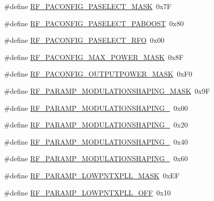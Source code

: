 \begin{DoxyCompactItemize}
\item 
\#define \hyperlink{sx1276Regs-Fsk_8h_a1f6faf51858096a4381e494bc157dedd}{R\+F\+\_\+\+P\+A\+C\+O\+N\+F\+I\+G\+\_\+\+P\+A\+S\+E\+L\+E\+C\+T\+\_\+\+M\+A\+SK}~0x7F
\item 
\#define \hyperlink{sx1276Regs-Fsk_8h_ae9a12e879be43e88ad7cff8f48010a9e}{R\+F\+\_\+\+P\+A\+C\+O\+N\+F\+I\+G\+\_\+\+P\+A\+S\+E\+L\+E\+C\+T\+\_\+\+P\+A\+B\+O\+O\+ST}~0x80
\item 
\#define \hyperlink{sx1276Regs-Fsk_8h_a01b86de3552e662d9994a1c4c4d8c571}{R\+F\+\_\+\+P\+A\+C\+O\+N\+F\+I\+G\+\_\+\+P\+A\+S\+E\+L\+E\+C\+T\+\_\+\+R\+FO}~0x00
\item 
\#define \hyperlink{sx1276Regs-Fsk_8h_aa89d945546b59e43c22a245423d58378}{R\+F\+\_\+\+P\+A\+C\+O\+N\+F\+I\+G\+\_\+\+M\+A\+X\+\_\+\+P\+O\+W\+E\+R\+\_\+\+M\+A\+SK}~0x8F
\item 
\#define \hyperlink{sx1276Regs-Fsk_8h_a88306565c0c75c9421326683fdcb84e8}{R\+F\+\_\+\+P\+A\+C\+O\+N\+F\+I\+G\+\_\+\+O\+U\+T\+P\+U\+T\+P\+O\+W\+E\+R\+\_\+\+M\+A\+SK}~0x\+F0
\item 
\#define \hyperlink{sx1276Regs-Fsk_8h_a2019a19e41c1a718452eb913fd9937d2}{R\+F\+\_\+\+P\+A\+R\+A\+M\+P\+\_\+\+M\+O\+D\+U\+L\+A\+T\+I\+O\+N\+S\+H\+A\+P\+I\+N\+G\+\_\+\+M\+A\+SK}~0x9F
\item 
\#define \hyperlink{sx1276Regs-Fsk_8h_a47d1468a141e8c1be9607da3cfc76603}{R\+F\+\_\+\+P\+A\+R\+A\+M\+P\+\_\+\+M\+O\+D\+U\+L\+A\+T\+I\+O\+N\+S\+H\+A\+P\+I\+N\+G\+\_}~0x00
\item 
\#define \hyperlink{sx1276Regs-Fsk_8h_af73d04396de25ed02028034df8c62a7e}{R\+F\+\_\+\+P\+A\+R\+A\+M\+P\+\_\+\+M\+O\+D\+U\+L\+A\+T\+I\+O\+N\+S\+H\+A\+P\+I\+N\+G\+\_}~0x20
\item 
\#define \hyperlink{sx1276Regs-Fsk_8h_aa4ea0dc5db5619e8e06345948cba2e67}{R\+F\+\_\+\+P\+A\+R\+A\+M\+P\+\_\+\+M\+O\+D\+U\+L\+A\+T\+I\+O\+N\+S\+H\+A\+P\+I\+N\+G\+\_}~0x40
\item 
\#define \hyperlink{sx1276Regs-Fsk_8h_a5b381c8b6905eb4a4ce79fef82b5d6df}{R\+F\+\_\+\+P\+A\+R\+A\+M\+P\+\_\+\+M\+O\+D\+U\+L\+A\+T\+I\+O\+N\+S\+H\+A\+P\+I\+N\+G\+\_}~0x60
\item 
\#define \hyperlink{sx1276Regs-Fsk_8h_a4821994144ee566eb3452c92c08d1801}{R\+F\+\_\+\+P\+A\+R\+A\+M\+P\+\_\+\+L\+O\+W\+P\+N\+T\+X\+P\+L\+L\+\_\+\+M\+A\+SK}~0x\+EF
\item 
\#define \hyperlink{sx1276Regs-Fsk_8h_a6ee4b65572eec82ea7473695aa118762}{R\+F\+\_\+\+P\+A\+R\+A\+M\+P\+\_\+\+L\+O\+W\+P\+N\+T\+X\+P\+L\+L\+\_\+\+O\+FF}~0x10
\item 

\end{DoxyCompactItemize}
